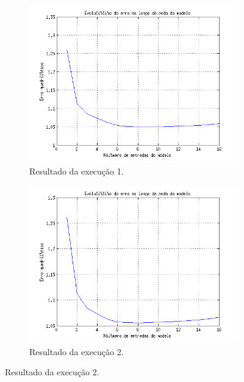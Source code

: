 		\begin{figure}[H] 
				
			\centering
			
				\begin{subfigure}{.5\textwidth}
				  \centering
				  \includegraphics[width=1\linewidth]{image/backward1_2}
				  \caption{Resultado da execução 1.}
				  \label{backward1_2}
				\end{subfigure}%
				\begin{subfigure}{.5\textwidth}
				  \centering
				  \includegraphics[width=1\linewidth]{image/backward2_2}
				  \caption{Resultado da execução 2.}
				  \label{backward2_2}
			\end{subfigure}
			

\end{figure}
